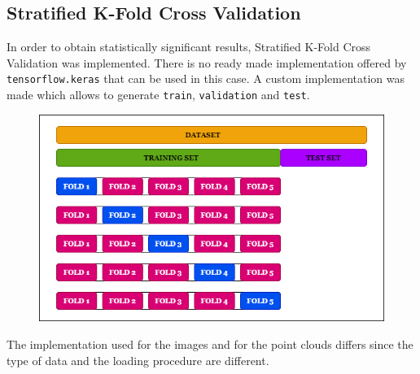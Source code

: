\documentclass[11pt,a4paper]{article}
\begin{document}
\subsection{Stratified K-Fold Cross Validation}
In order to obtain statistically significant results, Stratified K-Fold Cross Validation was implemented. There is no ready made implementation offered by \texttt{tensorflow.keras} that can be used in this case. A custom implementation was made which allows to generate \texttt{train}, \texttt{validation} and \texttt{test}.
\begin{figure}[H]
    \centering
    \includegraphics[scale=0.5]{imgs/train-validation-test.png}
\end{figure}
\noindent
The implementation used for the images and for the point clouds differs since the type of data and the loading procedure are different.
\end{document}
